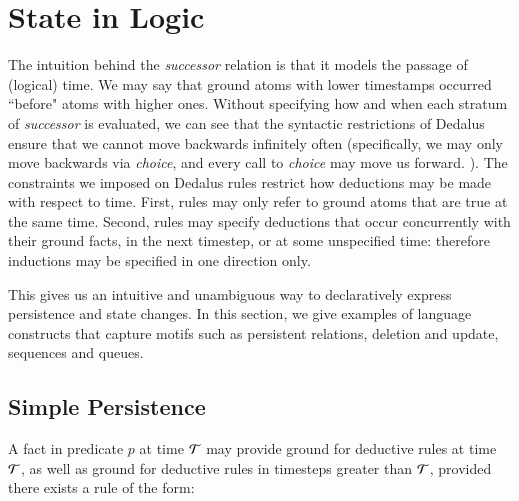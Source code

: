  \section{State in Logic}




The intuition behind the \emph{successor} relation is that it models the passage of (logical) time.  
We may say that ground atoms with lower timestamps occurred ``before" atoms with higher ones.
Without specifying how and when each stratum
of \emph{successor} is evaluated, we can see that the syntactic restrictions of Dedalus ensure that we cannot move backwards infinitely often (specifically,
we may only move backwards via \emph{choice}, and every call to \emph{choice} may move us forward.  ).
The constraints we imposed on Dedalus rules restrict how deductions may be made with respect to time.  First, rules may only refer to ground atoms that
are true at the same time.  Second, rules may specify deductions that occur concurrently with their ground facts, in the next timestep, or at some
unspecified time: therefore inductions may be specified in one direction only.

This gives us an intuitive and unambiguous way to declaratively express persistence and state changes.  In this section, we 
give examples of language constructs that capture motifs such as persistent relations, deletion and update, sequences
and queues.

\subsection{Simple Persistence}

A fact in predicate $p$ at time $\Tau$ may provide ground for deductive rules
at time $\Tau$, as well as ground for deductive rules in timesteps greater than $\Tau$,
provided there exists a rule of the form:

